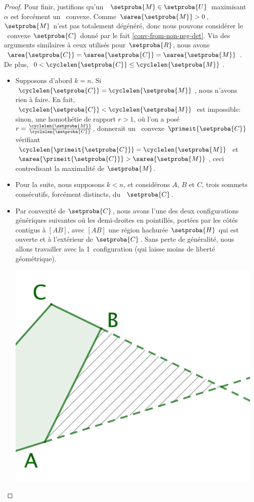 \begin{proof}
    
    Pour finir, justifions qu'un \ncycle\ $\setproba{M} \in \setproba{U}$ maximisant $\alpha$ est forcément un \ngone\ convexe. 
    Comme $\sarea{\setproba{M}} > 0$, $\setproba{M}$ n'est pas totalement dégénéré,
    donc nous pouvons considérer le \kgone\ convexe $\setproba{C}$ donné par le fait \ref{conv-from-non-neg-det}.
    Via des arguments similaires à ceux utilisés pour $\setproba{R}$, 
    nous avons $\area{\setproba{C}} = \sarea{\setproba{C}} = \sarea{\setproba{M}}$.
    De plus,
    $0 < \cyclelen{\setproba{C}} \leq \cyclelen{\setproba{M}}$.
    \begin{itemize}
		\item Supposons d'abord $k = n$.
		Si $\cyclelen{\setproba{C}} = \cyclelen{\setproba{M}}$, nous n'avons rien à faire.
		En fait, $\cyclelen{\setproba{C}} < \cyclelen{\setproba{M}}$ est impossible: 
		sinon, une homothétie de rapport $r > 1$, où l'on a posé $r = \frac{ \cyclelen{\setproba{M}} }{ \cyclelen{\setproba{C}} }$, donnerait un \ngone\ convexe $\primeit{\setproba{C}}$ vérifiant
		$\cyclelen{\primeit{\setproba{C}}} = \cyclelen{\setproba{M}}$
		et
		$\sarea{\primeit{\setproba{C}}} > \sarea{\setproba{M}}$, ceci contredisant la maximalité de $\setproba{M}$.


		\item Pour la suite, nous supposons $k < n$, et considérons $A$, $B$ et $C$, trois sommets consécutifs, forcément distincts, du \kgone\ $\setproba{C}$. 


		\item Par convexité de $\setproba{C}$, nous avons l'une des deux configurations génériques suivantes où les demi-droites en pointillés, portées par les côtés contigus à $[AB]$,  avec $[AB]$ une région hachurée $\setproba{H}$ qui est ouverte et à l'extérieur de $\setproba{C}$. 
		Sans perte de généralité, nous allons travailler avec la 1\iere\ configuration (qui laisse moins de liberté géométrique).
		\begin{multicols}{2}
			\centering

			\includegraphics[scale=.35]{add-vertex-1.png}


\end{multicols}
\end{itemize}
\end{proof}
